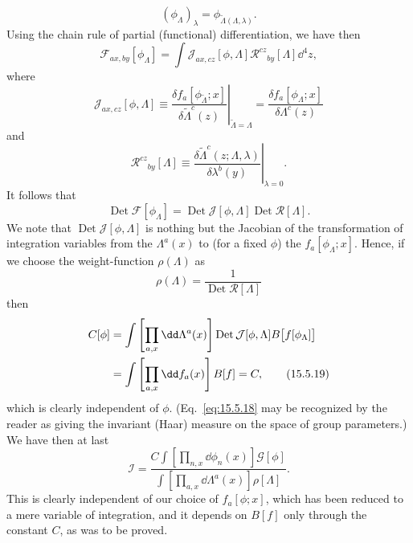 \begin{equation}
  (\phi_\Lambda)_\lambda=\phi_{\widetilde\Lambda(\Lambda,\lambda)}.
  \tag{15.5.13}\label{eq:15.5.13}
\end{equation}
Using the chain rule of partial (functional) differentiation, we have then
\begin{equation}
  \mathcal F_{a x,b y}[\phi_\Lambda]
  =\int\mathcal J_{a x,c z}[\phi,\Lambda]
  \mathcal R^{c z}{}_{b y}[\Lambda]\dd^4z,
  \tag{15.5.14}\label{eq:15.5.14}
\end{equation}
where
\begin{equation}
  \mathcal J_{a x,c z}[\phi,\Lambda]
  \equiv\left.\frac{\delta f_a[\phi_{\widetilde\Lambda};x]}
  {\delta\widetilde\Lambda^c(z)}\right|_{\widetilde\Lambda=\Lambda}
  =\frac{\delta f_a[\phi_\Lambda;x]}{\delta\Lambda^c(z)}
  \tag{15.5.15}\label{eq:15.5.15}
\end{equation}
and
\begin{equation}
  \mathcal R^{c z}{}_{b y}[\Lambda]
  \equiv\left.\frac{\delta\widetilde\Lambda^c(z;\Lambda,\lambda)}
  {\delta\lambda^b(y)}\right|_{\lambda=0}.
  \tag{15.5.16}\label{eq:15.5.16}
\end{equation}
It follows that
\begin{equation}
  \operatorname{Det}\mathcal F[\phi_\Lambda]
  =\operatorname{Det}\mathcal J[\phi,\Lambda]
  \operatorname{Det}\mathcal R[\Lambda].
  \tag{15.5.17}\label{eq:15.5.17}
\end{equation}
We note that $\operatorname{Det}\mathcal J[\phi,\Lambda]$ is nothing but the
Jacobian of the transformation of integration variables from the
$\Lambda^a(x)$ to (for a fixed $\phi$) the $f_a[\phi_\Lambda;x]$.
Hence, if we choose the weight-function $\rho(\Lambda)$ as
\begin{equation}
  \rho(\Lambda)=\frac{1}{\operatorname{Det}\mathcal R[\Lambda]}
  \tag{15.5.18}\label{eq:15.5.18}
\end{equation}
then
\begin{align}
  C[\phi]
  &=\int\left[\prod_{a,x}\dd\Lambda^a(x)\right]
  \operatorname{Det}\mathcal J[\phi,\Lambda]
  B\bigl[f[\phi_\Lambda]\bigr]
  \notag\\
  &=\int\left[\prod_{a,x}\dd f_a(x)\right]B[f]=C,
  \tag{15.5.19}\label{eq:15.5.19}
\end{align}
which is clearly independent of $\phi$. (Eq.~\eqref{eq:15.5.18} may be
recognized by the reader as giving the invariant (Haar) measure on the space
of group parameters.) We have then at last
\begin{equation}
  \mathcal I=
  \frac{C\displaystyle\int\left[\prod_{n,x}\dd\phi_n(x)\right]
  \mathcal G[\phi]}
  {\displaystyle\int\left[\prod_{a,x}\dd\Lambda^a(x)\right]
  \rho[\Lambda]}.
  \tag{15.5.20}\label{eq:15.5.20}
\end{equation}
This is clearly independent of our choice of $f_a[\phi;x]$, which has
been reduced to a mere variable of integration, and it depends on $B[f]$ only
through the constant $C$, as was to be proved.

